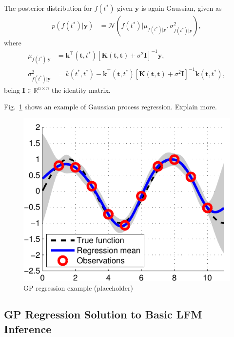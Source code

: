 \documentclass[journal]{IEEEtran}
\newcommand{\simo}[1]{{\color{red}#1}}
\begin{document}
The posterior distribution for $f(t^*)$ given $\mathbf{y}$ is again Gaussian, given as
\begin{align*}
p(f(t^*)|\mathbf{y}) & =\mathcal{N}(f(t^*)|\mu_{f(t^*)|\mathbf{y}}, \sigma^2_{f(t^*)|\mathbf{y}}),
\end{align*}
where
\begin{align*}
\mu_{f(t^*)|\mathbf{y}} & = \mathbf{k}^{\top}(\mathbf{t}, t^*)\left[\mathbf{K}(\mathbf{t}, \mathbf{t}) +
\sigma^2\mathbf{I}\right]^{-1}\mathbf{y},\\
\sigma^2_{f(t^*)|\mathbf{y}} & = k(t^*, t^*) - \mathbf{k}^{\top}(\mathbf{t}, t^*)\left[\mathbf{K}(\mathbf{t}, \mathbf{t}) +
\sigma^2\mathbf{I}\right]^{-1}\mathbf{k}(\mathbf{t}, t^*),
\end{align*}
being $\mathbf{I}\in\mathbb{R}^{n\times n}$ the identity matrix.

Fig.~\ref{reg_ex} shows an example of Gaussian process regression. \simo{Explain more.}

\begin{figure}[!t]
\centering
\includegraphics[width=\columnwidth]{reg_ex}
\caption{GP regression example (placeholder)}
\label{reg_ex}
\end{figure}


\subsection{GP Regression Solution to Basic LFM Inference}\label{sec:gp:regression:lfm}
%
\end{document}
